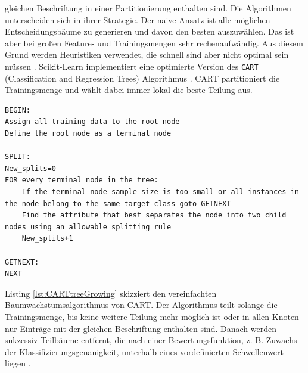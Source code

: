 gleichen Beschriftung in einer Partitionierung enthalten sind. Die Algorithmen unterscheiden sich in ihrer Strategie. Der naive Ansatz ist alle möglichen Entscheidungsbäume zu generieren und davon den besten auszuwählen.
Das ist aber bei großen Feature- und Trainingsmengen sehr rechenaufwändig. Aus diesem Grund werden Heuristiken verwendet, die schnell sind aber nicht optimal sein müssen \cite{quinlan1986induction}.
\newline
\newline
Scikit-Learn implementiert eine optimierte Version des \texttt{CART} (Classification and Regression Trees) Algorithmus \cite{ScikitLearnCART}.
CART partitioniert die Trainingsmenge und wählt dabei immer lokal die beste Teilung aus.
\begin{lstlisting}[label=lst:CARTtreeGrowing,caption={Skizze von vereinfachten Baumwachstumsalgorithmus \cite{steinbergCART}.}]
BEGIN:
Assign all training data to the root node
Define the root node as a terminal node

SPLIT:
New_splits=0
FOR every terminal node in the tree:
    If the terminal node sample size is too small or all instances in the node belong to the same target class goto GETNEXT
    Find the attribute that best separates the node into two child nodes using an allowable splitting rule
    New_splits+1

GETNEXT:
NEXT
\end{lstlisting}
Listing \ref{lst:CARTtreeGrowing} skizziert den vereinfachten Baumwachstumsalgorithmus von CART. Der Algorithmus teilt solange die Trainingsmenge, bis keine weitere Teilung mehr möglich ist oder in allen Knoten nur
Einträge mit der gleichen Beschriftung enthalten sind. Danach werden sukzessiv Teilbäume entfernt, die nach einer Bewertungsfunktion, z. B. Zuwachs der Klassifizierungsgenauigkeit, unterhalb eines vordefinierten
Schwellenwert liegen \cite{steinbergCART}.
